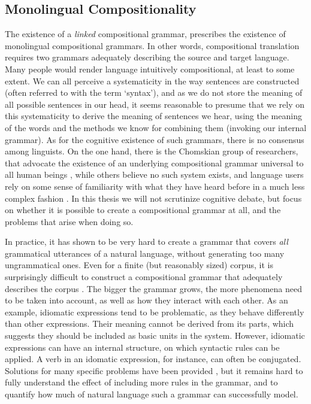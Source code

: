 \subsection{Monolingual Compositionality}
\label{subsec:monolingual_problems}

The existence of a \textit{linked} compositional grammar, prescribes the existence of monolingual compositional grammars. In other words, compositional translation requires two grammars adequately describing the source and target language. Many people would render language intuitively compositional, at least to some extent. We can all perceive a systematicity in the way sentences are constructed (often referred to with the term `syntax'), and as we do not store the meaning of all possible sentences in our head, it seems reasonable to presume that we rely on this systematicity to derive the meaning of sentences we hear, using the meaning of the words and the methods we know for combining them (invoking our internal grammar). As for the cognitive existence of such grammars, there is no consensus among linguists. On the one hand, there is the Chomskian group of researchers, that advocate the existence of an underlying compositional grammar universal to all human beings \citep[as first claimed in][]{chomsky1956three}, while others believe no such system exists, and language users rely on some sense of familiarity with what they have heard before in a much less complex fashion \citep[quite recently, e.g.,][]{frank2012hierarchical}. In this thesis we will not scrutinize cognitive debate, but focus on whether it is possible to create a compositional grammar at all, and the problems that arise when doing so.

In practice, it has shown to be very hard to create a grammar that covers \textit{all} grammatical utterances of a natural language, without generating too many ungrammatical ones.  Even for a finite (but reasonably sized) corpus, it is surprisingly difficult to construct a compositional grammar that adequately describes the corpus \citep{scha1990taaltheorie}. The bigger the grammar grows, the more phenomena need to be taken into account, as well as how they interact with each other. As an example, idiomatic expressions tend to be problematic, as they behave differently than other expressions. Their meaning cannot be derived from its parts, which suggests they should be included as basic units in the system. However, idiomatic expressions can have an internal structure, on which syntactic rules can be applied. A verb in an idomatic expression, for instance, can often be conjugated. Solutions for many specific problems have been provided \citep[in e.g.,][]{janssen1996compositionality}, but it remains hard to fully understand the effect of including more rules in the grammar, and to quantify how much of natural language such a grammar can successfully model.

